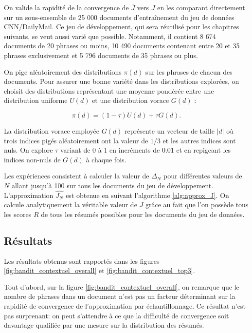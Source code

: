 On valide la rapidité de la convergence de $\bar{J}$ vers $J$ en les comparant
directement sur un sous-ensemble de 25 000 documents d'entraînement du jeu 
de données CNN/DailyMail.
Ce jeu de développement, qui sera réutilisé pour les chapitres suivants, 
se veut aussi varié que possible.
Notamment, il contient 8 674 documents de 20 phrases ou moins, 10 490
documents contenant entre 20 et 35 phrases exclusivement et 5 796 documents 
de 35 phrases ou plus.

On pige aléatoirement des distributions $\pi(d)$ sur les phrases de chacun des documents.
Pour assurer une bonne variété dans les distributions explorées, on choisit des
distributions représentant une moyenne pondérée entre une distribution uniforme
$U(d)$ et une distribution vorace $G(d)$ :

\begin{equation}
    \pi(d) = (1 - \tau) U(d) + \tau G(d).
\end{equation}

La distribution vorace employée $G(d)$ représente un vecteur de taille $|d|$ où trois indices 
pigés aléatoirement ont la valeur de $1/3$ et les autres indices sont nuls.
On explore $\tau$ variant de 0 à 1 en incréments de 0.01 et en repigeant les indices 
non-nuls de $G(d)$ à chaque fois.

Les expériences consistent à calculer la valeur de $\Delta_N$ pour différentes valeurs
de $N$ allant jusqu'à 100 sur tous les documents du jeu de développement.
L'approximation $\hat{J_N}$ est obtenue en suivant l'algorithme \ref{alg:approx_J}.
On calcule analytiquement la véritable valeur de $J$ grâce au fait que l'on possède tous les scores
$R$ de tous les résumés possibles pour les documents du jeu de données.

\subsection{Résultats}

Les résultats obtenus sont rapportés dans les figures \ref{fig:bandit_contextuel_overall}
et \ref{fig:bandit_contextuel_top3}.

Tout d'abord, sur la figure \ref{fig:bandit_contextuel_overall}, on remarque que le nombre de phrases dans un document n'est pas un
facteur déterminant sur la rapidité de convergence de l'approximation par échantillonnage.
Ce résultat n'est pas surprenant: on peut s'attendre à ce que la difficulté
de convergence soit davantage qualifiée par une mesure sur la distribution
des résumés.


